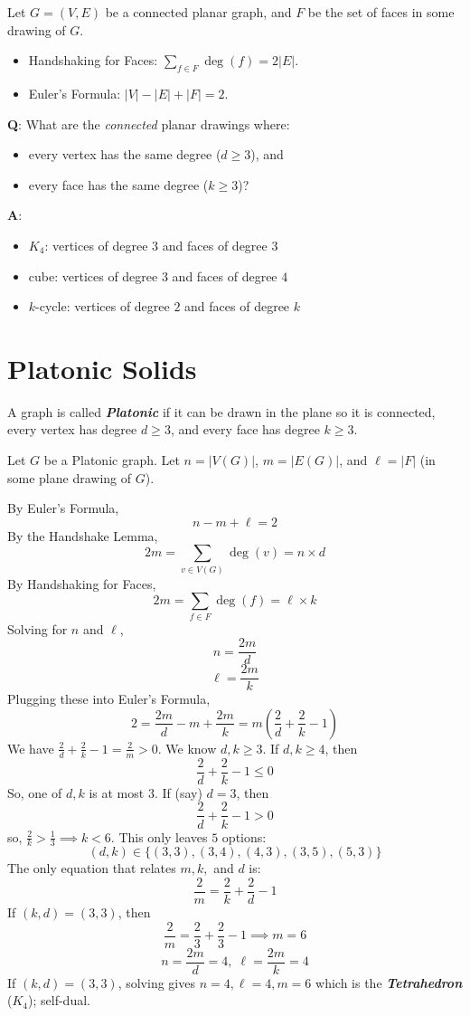 Let $ G=(V,E) $ be a connected planar graph, and $ F $ be the set of faces
in some drawing of $ G $.
\begin{itemize}
    \item Handshaking for Faces: $ \sum\limits_{f\in F}\deg(f)=2|E| $.
    \item Euler's Formula: $ |V|-|E|+|F|=2 $.
\end{itemize}

\textbf{Q}: What are the \emph{connected} planar drawings where:
\begin{itemize}
    \item every vertex has the same degree ($ d\geqslant 3 $), and
    \item every face has the same degree ($ k\geqslant 3 $)?
\end{itemize}

\textbf{A}:
\begin{itemize}
    \item $ K_4 $: vertices of degree $ 3 $ and faces of degree $ 3 $
    \item cube: vertices of degree $ 3 $ and faces of degree $ 4 $
    \item $ k $-cycle: vertices of degree $ 2 $ and faces of degree $ k $
\end{itemize}

\section{Platonic Solids}

\begin{Definition}{}{}
    A graph is called \textbf{\emph{Platonic}} if it can be drawn in
    the plane so it is connected, every vertex has degree
    $ d\geqslant 3 $, and every face has degree $ k\geqslant 3 $.
\end{Definition}


Let $ G $ be a Platonic graph. Let $ n=|V(G)| $, $ m=|E(G)| $,
and $ \ell=|F| $ (in some plane drawing of $ G $).

By Euler's Formula,
\[ n-m+\ell=2 \]
By the Handshake Lemma,
\[ 2m=\sum\limits_{v\in V(G)}\deg(v)=n\times d \]
By Handshaking for Faces,
\[ 2m=\sum\limits_{f\in F}\deg(f)=\ell\times k \]
Solving for $ n $ and $ \ell $,
\[ n=\frac{2m}{d} \]
\[ \ell=\frac{2m}{k} \]
Plugging these into Euler's Formula,
\[ 2=\frac{2m}{d}-m+\frac{2m}{k}=m\left(\frac{2}{d}+\frac{2}{k}-1\right) \]
We have $ \frac{2}{d} +\frac{2}{k} -1=\frac{2}{m} >0 $.
We know $ d,k\geqslant 3 $. If $ d,k\geqslant 4 $, then
\[ \frac{2}{d} + \frac{2}{k} - 1\leqslant 0 \]
So, one of $ d,k $ is at most $ 3 $. If (say) $ d=3 $, then
\[ \frac{2}{d} +\frac{2}{k} -1>0 \]
so, $ \frac{2}{k} >\frac{1}{3} \implies k<6 $. This
only leaves $ 5 $ options:
\[ (d,k)\in \{(3,3),(3,4),(4,3),(3,5),(5,3)\} \]
The only equation that relates $ m,k, $ and $ d $ is:
\[ \frac{2}{m} = \frac{2}{k} +\frac{2}{d} -1 \]
If $ (k,d)=(3,3) $, then
\[ \frac{2}{m} =\frac{2}{3} +\frac{2}{3} -1\implies m=6 \]
\[ n=\frac{2m}{d} =4,\; \ell=\frac{2m}{k} =4 \]
If $ (k,d)=(3,3) $, solving gives $ n=4,\ell=4,m=6 $ which is
the \textbf{\emph{Tetrahedron}} ($ K_4 $); self-dual.

